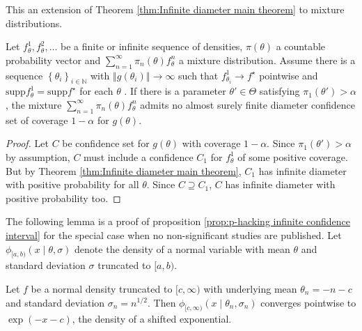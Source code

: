 \documentclass[twoside]{article}
\begin{document}
This an extension of Theorem \ref{thm:Infinite diameter main theorem}
to mixture distributions.
\begin{prop}
\label{cor:Mixture model corollary}Let $f_{\theta}^{1},f_{\theta}^{2},\ldots$
be a finite or infinite sequence of densities, $\pi(\theta)$
a countable probability vector and $\sum_{n=1}^{\infty}\pi_{n}(\theta)f_{\theta}^{n}$
a mixture distribution. Assume there is a sequence $\left\{ \theta_{i}\right\} _{i\in\mathbb{N}}$
with $\left\Vert g(\theta_{i})\right\Vert \to\infty$ such
that $f_{\theta_{i}}^{1}\to f^{\star}$ pointwise and $\textrm{supp}f_{\theta}^{1} = \textrm{supp}f^{\star}$
for each $\theta$ . If there is a parameter $\theta'\in\Theta$ satisfying
$\pi_{1}(\theta')>\alpha$, the mixture $\sum_{n=1}^{\infty}\pi_{n}(\theta)f_{\theta}^{n}$
admits no almost surely finite diameter confidence set of coverage
$1-\alpha$ for $g(\theta)$.
\end{prop}

\begin{proof}
Let $C$ be confidence set for $g(\theta)$ with coverage
$1-\alpha$. Since $\pi_{1}(\theta')>\alpha$ by assumption,
$C$ must include a confidence $C_{1}$ for $f_{\theta}^{1}$ of some
positive coverage. But by Theorem \ref{thm:Infinite diameter main theorem},
$C_{1}$ has infinite diameter with positive probability for all $\theta$.
Since $C\supseteq C_{1}$, $C$ has infinite diameter with positive
probability too.
\end{proof}
The following lemma is a proof of proposition \ref{prop:p-hacking infinite confidence interval}
for the special case when no non-significant studies are published.
Let $\phi_{[a,b)}(x\mid\theta,\sigma)$ denote
the density of a normal variable with mean $\theta$ and standard
deviation $\sigma$ truncated to $[a,b)$.
\begin{lem}
\label{lem:One-sided normal limit}Let $f$ be a normal density truncated
to $[c,\infty)$ with underlying mean $\theta_{n}=-n-c$
and standard deviation $\sigma_{n}=n^{1/2}$. Then $\phi_{[c,\infty)}(x\mid\theta_{n},\sigma_{n})$
converges pointwise to $\exp(-x-c)$, the density of a
shifted exponential.
\end{lem}
\end{document}

